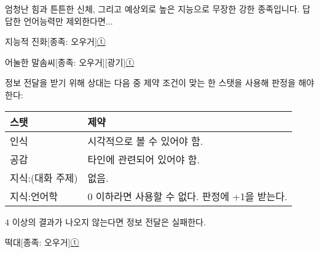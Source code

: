 \documentclass{report}
\begin{document}
	엄청난 힘과 튼튼한 신체, 그리고 예상외로 높은 지능으로 무장한 강한 종족입니다. 답답한 언어능력만 제외한다면...
	
	\begin{story}{지능적 진화}{[종족: 오우거]\hyperlink{celesteela}{ⓣ}}
		
	\end{story}
	
	\begin{story}{어눌한 말솜씨}{[종족: 오우거][광기]\hyperlink{celesteela}{ⓣ}}
		{정보 전달을 받기 위해 상대는 다음 중 제약 조건이 맞는 한 스탯을 사용해 판정을 해야한다:
		
		\begin{tightcenter}
			\begin{tabular}{l|l}
				\textbf{스탯}    & \textbf{제약}                                  \\\hline\hline
				인식             & 시각적으로 볼 수 있어야 함.                    \\\hline
				공감             & 타인에 관련되어 있어야 함.                     \\\hline
				지식:(대화 주제) & 없음.                                          \\\hline
				지식:언어학      & 0 이하라면 사용할 수 없다. 판정에 +1을 받는다.
			\end{tabular}
		\end{tightcenter}
		
		4 이상의 결과가 나오지 않는다면 정보 전달은 실패한다.}
		
		
	\end{story}
	
	\begin{story}{떡대}{[종족: 오우거]\hyperlink{celesteela}{ⓣ}}
		
		
		
	\end{story}
\end{document}
